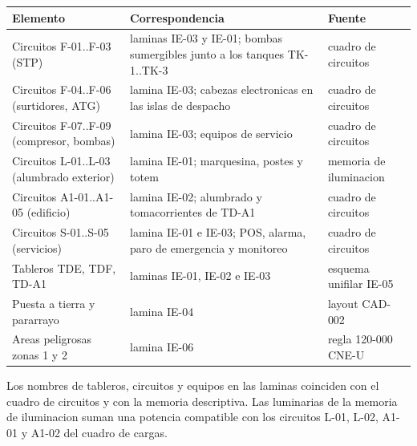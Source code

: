 \begin{center}
\small
\begin{tabularx}{\linewidth}{@{}L X L@{}}
\toprule
Elemento & Correspondencia & Fuente \\
\midrule
Circuitos F-01..F-03 (STP) & laminas IE-03 y IE-01; bombas sumergibles junto a
  los tanques TK-1..TK-3 & cuadro de circuitos \\
Circuitos F-04..F-06 (surtidores, ATG) & lamina IE-03; cabezas electronicas en
  las islas de despacho & cuadro de circuitos \\
Circuitos F-07..F-09 (compresor, bombas) & lamina IE-03; equipos de servicio &
  cuadro de circuitos \\
Circuitos L-01..L-03 (alumbrado exterior) & lamina IE-01; marquesina, postes y
  totem & memoria de iluminacion \\
Circuitos A1-01..A1-05 (edificio) & lamina IE-02; alumbrado y tomacorrientes de
  TD-A1 & cuadro de circuitos \\
Circuitos S-01..S-05 (servicios) & lamina IE-01 e IE-03; POS, alarma, paro de
  emergencia y monitoreo & cuadro de circuitos \\
Tableros TDE, TDF, TD-A1 & laminas IE-01, IE-02 e IE-03 & esquema unifilar IE-05 \\
Puesta a tierra y pararrayo & lamina IE-04 & layout CAD-002 \\
Areas peligrosas zonas 1 y 2 & lamina IE-06 & regla 120-000 CNE-U \\
\bottomrule
\end{tabularx}
\end{center}

Los nombres de tableros, circuitos y equipos en las laminas coinciden con el
cuadro de circuitos y con la memoria descriptiva. Las luminarias de la memoria
de iluminacion suman una potencia compatible con los circuitos L-01, L-02,
A1-01 y A1-02 del cuadro de cargas.
